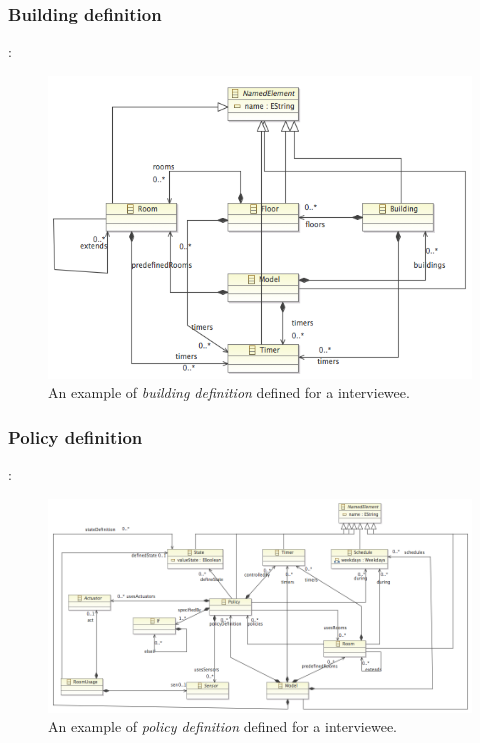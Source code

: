 \documentclass{llncs}
\begin{document}
\subsubsection{Building definition}:
\begin{figure}
  \centering \includegraphics[scale=0.4]{ecore-building-definition.png}  
	\caption{An example of \textit{building definition} defined for a interviewee.}
	\label{fig:ecore-building-definition}
\end{figure}

\subsubsection{Policy definition}:
\begin{figure}
  \centering
    \includegraphics[scale=0.3]{ecore-policy-definition.png}	
	\caption{An example of \textit{policy definition} defined for a interviewee.}
	\label{fig:ecore-policy-definition}
\end{figure}
\end{document}
